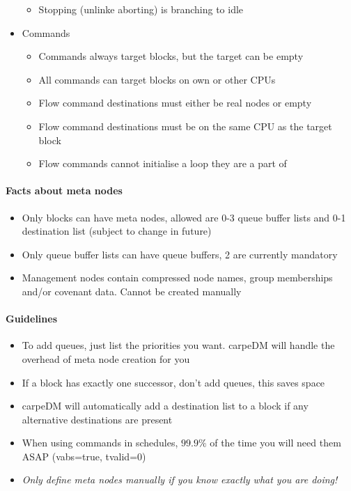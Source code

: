 \begin{itemize}
\begin{itemize}
    \item{Stopping (unlinke aborting) is branching to idle}
  \end{itemize}
  \item{Commands}
  \begin{itemize}
    \item{Commands always target blocks, but the target can be empty}
    \item{All commands can target blocks on own or other CPUs}
    \item{Flow command destinations must either be real nodes or empty}
    \item{Flow command destinations must be on the same CPU as the target block}
    \item{Flow commands cannot initialise a loop they are a part of}
\end{itemize}
\end{itemize}

\paragraph{Facts about meta nodes}
\begin{itemize}
  \item{Only blocks can have meta nodes, allowed are 0-3 queue buffer lists and 0-1 destination list (subject to change in future)}
  \item{Only queue buffer lists can have queue buffers, 2 are currently mandatory}
  \item{Management nodes contain compressed node names, group memberships and/or covenant data. Cannot be created manually}
\end{itemize}

\paragraph{Guidelines}
\begin{itemize}
  \item{To add queues, just list the priorities you want. carpeDM will handle the overhead of meta node creation for you}
  \item{If a block has exactly one successor, don't add queues, this saves space}
  \item{carpeDM will automatically add a destination list to a block if any alternative destinations are present}
  \item{When using commands in schedules, $99.9\%$ of the time you will need them ASAP (vabs=true, tvalid=0) }
  \item{\emph{Only define meta nodes manually if you know exactly what you are doing!}}
\end{itemize}

